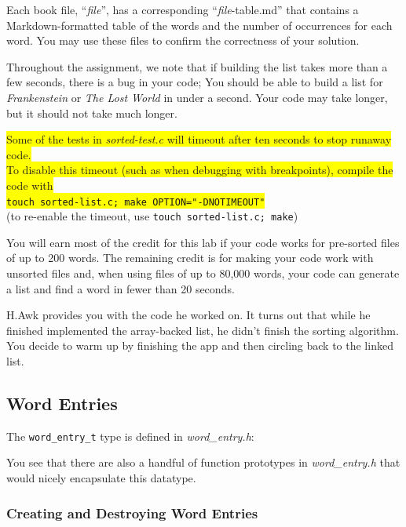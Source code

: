 Each book file, ``\textit{file}'', has a corresponding ``\textit{file}-table.md'' that contains a Markdown-formatted table of the words and the number of occurrences for each word.
You may use these files to confirm the correctness of your solution.

Throughout the assignment, we note that if building the list takes more than a few seconds, there is a bug in your code;
You should be able to build a list for \textit{Frankenstein} or \textit{The Lost World} in under a second.
Your code may take longer, but it should not take much longer.

\colorbox{yellow}{Some of the tests in \textit{sorted-test.c} will timeout after ten seconds to stop runaway code.} \\
\colorbox{yellow}{To disable this timeout (such as when debugging with breakpoints), compile the code with} \\
\colorbox{yellow}{\texttt{touch sorted-list.c; make OPTION="-DNOTIMEOUT"}} \\
(to re-enable the timeout, use \texttt{touch sorted-list.c; make})

You will earn most of the credit for this lab if your code works for pre-sorted files of up to 200 words.
The remaining credit is for making your code work with unsorted files and, when using files of up to 80,000 words, your code can generate a list and find a word in fewer than 20 seconds.

\vspace{1cm}

H.Awk provides you with the code he worked on.
It turns out that while he finished implemented the array-backed list, he didn't finish the sorting algorithm.
You decide to warm up by finishing the app and then circling back to the linked list.

\subsection{Word Entries}

The \lstinline{word_entry_t} type is defined in \textit{word\_entry.h}:



You see that there are also a handful of function prototypes in \textit{word\_entry.h} that would nicely encapsulate this datatype.

\subsubsection{Creating and Destroying Word Entries}

